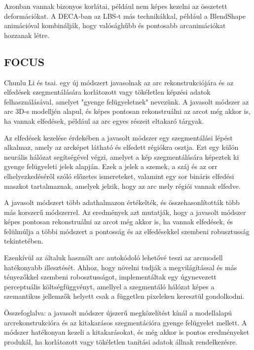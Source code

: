 \documentclass[12pt,a4]{article}
\begin{document}
                Azonban vannak bizonyos korlátai, például nem képes kezelni az összetett deformációkat. A DECA-ban az LBS-t más technikákkal, például a 
                BlendShape animációval kombinálják, hogy valósághűbb és pontosabb arcanimációkat hozzanak létre.

        \subsection{FOCUS}

            \cite{focus}Chunlu Li és tsai. egy új módszert javasolnak az arc rekonstrukciójára és az elfedések szegmentálására korlátozott vagy tökéletlen képzési adatok felhasználásával, amelyet "gyenge felügyeletnek" nevezünk. A javasolt módszer az arc 3D-s modelljén alapul, és képes pontosan rekonstruálni az arcot még akkor is, ha vannak elfedések, például az arc egyes részeit eltakaró tárgyak.
    
            Az elfedések kezelése érdekében a javasolt módszer egy szegmentálási lépést alkalmaz, amely az arcképet látható és elfedett régiókra osztja. Ezt egy külön neurális hálózat segítségével végzi, amelyet a kép szegmentálására képeztek ki gyenge felügyeleti jelek alapján. Ezek a jelek a szemek, a száj és az orr elhelyezkedéséről szóló előzetes ismereteket, valamint egy sor bináris elfedési maszkot tartalmaznak, amelyek jelzik, hogy az arc mely régiói vannak elfedve.
    
            A javasolt módszert több adathalmazon értékelték, és összehasonlították több más korszerű módszerrel. Az eredmények azt mutatják, hogy a javasolt módszer képes pontosan rekonstruálni az arcot még akkor is, ha vannak elfedések, és felülmúlja a többi módszert a pontosság és az elfedésekkel szembeni robusztusság tekintetében.
    
            Ezenkívül az általuk használt arc autokódoló lehetővé teszi az arcmodell hatékonyabb illesztését. Ahhoz, hogy növelni tudják a megvilágítással és
     	      más tényezőkkel szembeni robosztusságot, implementáltak egy úgynevezett
     	      perceptuális költségfüggvényt, amellyel a szegmentáló hálózat képes a 
            szemantikus jellemzők helyett csak a független pixeleken keresztül gondolkodni.
    
            Összefoglalva: a javasolt módszer újszerű megközelítést kínál a modellalapú arcrekonstrukcióra és az kitakarásos szegmentációra gyenge felügyelet mellett. A módszer hatékonyan kezeli a kitakarásokat, és még akkor is pontos eredményeket produkál, ha korlátozott vagy tökéletlen tanítási adatok állnak rendelkezésre.
\end{document}
